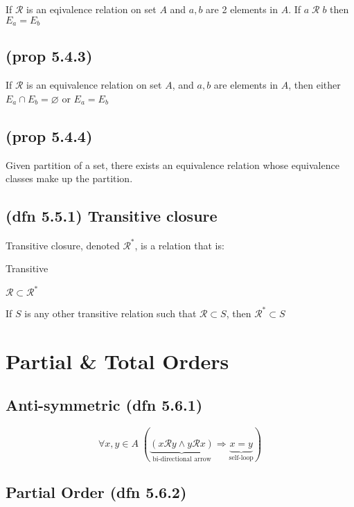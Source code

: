 \documentclass[12pt]{article}
\begin{document}
\begin{spacing}{1.5}
If $\mathcal{R}$ is an eqivalence relation on set $A$ and $a, b$ are 2 elements in $A$. If $a \; \mathcal{R} \; b$ then $E_a = E_b$

\subsection{(prop 5.4.3)}

If $\mathcal{R}$ is an equivalence relation on set $A$, and $a, b$ are elements in $A$, then either $E_a \cap E_b = \varnothing$ or $E_a = E_b$

\subsection{(prop 5.4.4)}

Given partition of a set, there exists an equivalence relation whose equivalence classes make up the partition. 

\subsection{(dfn 5.5.1) Transitive closure}

Transitive closure, denoted $\mathcal{R}^*$, is a relation that is: 

\begin{itemize*}
	\item Transitive
	\item $\mathcal{R} \subset \mathcal{R}^*$
	\item If $S$ is any other transitive relation such that $\mathcal{R} \subset S$, then $\mathcal{R}^* \subset S$
\end{itemize*}

\section{Partial \& Total Orders}

\subsection{Anti-symmetric (dfn 5.6.1)}

$$\forall x, y \in A \;
(\underbrace{(x \mathcal{R} y \wedge y \mathcal{R} x)}_{\text{bi-directional arrow}} \Rightarrow \underbrace{x = y}_{\text{self-loop}})$$

\subsection{Partial Order (dfn 5.6.2)}


\end{spacing}
\end{document}
